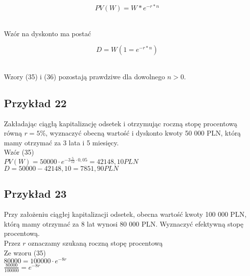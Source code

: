 \documentclass{article}
\begin{document}
\begin{center}
	\begin{equation}
		PV(W) = W * e^{-r*n}
	\end{equation}
\end{center}\\

Wzór na dyskonto ma postać

\begin{center}
	\begin{equation}
		D = W(1 = e^{-r * n})
	\end{equation}
\end{center}\\

Wzory (35) i (36) pozostają prawdziwe dla dowolnego $ n > 0 $.

\subsection{Przykład 22}

Zakładając ciągłą kapitalizację odsetek i otrzymując roczną stopę procentową równą $ r = 5\%  $, wyznaczyć obecną wartość i dyskonto kwoty 50 000 PLN, którą mamy otrzymać za 3 lata i 5 miesięcy.\\

Wzór (35)\\

$ PV(W) =  50 000 \cdot e^{-3\frac{5}{12} \cdot 0,05} = 42 148,10 PLN$\\

$ D = 50 000 - 42 148,10 = 7 851,90 PLN $

\subsection{Przykład 23}

Przy założeniu ciągłej kapitalizacji odsetek, obecna wartość kwoty 100 000 PLN, którą mamy otrzymać za 8 lat wynosi 80 000 PLN. Wyznaczyć efektywną stopę procentową.\\

Przez $ r $ oznaczamy szukaną roczną stopę procentową\\

Ze wzoru (35)\\

$ 80 000 = 100 000 \cdot e^{-8r} $\\

$ \frac{80 000}{100 000} = e^{-8r} $\\
\end{document}
